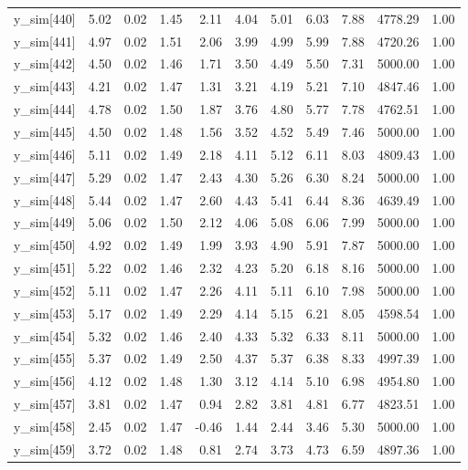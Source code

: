\begin{table}[ht]
\begin{tabular}{rrrrrrrrrrr}
  y\_sim[440] & 5.02 & 0.02 & 1.45 & 2.11 & 4.04 & 5.01 & 6.03 & 7.88 & 4778.29 & 1.00 \\ 
  y\_sim[441] & 4.97 & 0.02 & 1.51 & 2.06 & 3.99 & 4.99 & 5.99 & 7.88 & 4720.26 & 1.00 \\ 
  y\_sim[442] & 4.50 & 0.02 & 1.46 & 1.71 & 3.50 & 4.49 & 5.50 & 7.31 & 5000.00 & 1.00 \\ 
  y\_sim[443] & 4.21 & 0.02 & 1.47 & 1.31 & 3.21 & 4.19 & 5.21 & 7.10 & 4847.46 & 1.00 \\ 
  y\_sim[444] & 4.78 & 0.02 & 1.50 & 1.87 & 3.76 & 4.80 & 5.77 & 7.78 & 4762.51 & 1.00 \\ 
  y\_sim[445] & 4.50 & 0.02 & 1.48 & 1.56 & 3.52 & 4.52 & 5.49 & 7.46 & 5000.00 & 1.00 \\ 
  y\_sim[446] & 5.11 & 0.02 & 1.49 & 2.18 & 4.11 & 5.12 & 6.11 & 8.03 & 4809.43 & 1.00 \\ 
  y\_sim[447] & 5.29 & 0.02 & 1.47 & 2.43 & 4.30 & 5.26 & 6.30 & 8.24 & 5000.00 & 1.00 \\ 
  y\_sim[448] & 5.44 & 0.02 & 1.47 & 2.60 & 4.43 & 5.41 & 6.44 & 8.36 & 4639.49 & 1.00 \\ 
  y\_sim[449] & 5.06 & 0.02 & 1.50 & 2.12 & 4.06 & 5.08 & 6.06 & 7.99 & 5000.00 & 1.00 \\ 
  y\_sim[450] & 4.92 & 0.02 & 1.49 & 1.99 & 3.93 & 4.90 & 5.91 & 7.87 & 5000.00 & 1.00 \\ 
  y\_sim[451] & 5.22 & 0.02 & 1.46 & 2.32 & 4.23 & 5.20 & 6.18 & 8.16 & 5000.00 & 1.00 \\ 
  y\_sim[452] & 5.11 & 0.02 & 1.47 & 2.26 & 4.11 & 5.11 & 6.10 & 7.98 & 5000.00 & 1.00 \\ 
  y\_sim[453] & 5.17 & 0.02 & 1.49 & 2.29 & 4.14 & 5.15 & 6.21 & 8.05 & 4598.54 & 1.00 \\ 
  y\_sim[454] & 5.32 & 0.02 & 1.46 & 2.40 & 4.33 & 5.32 & 6.33 & 8.11 & 5000.00 & 1.00 \\ 
  y\_sim[455] & 5.37 & 0.02 & 1.49 & 2.50 & 4.37 & 5.37 & 6.38 & 8.33 & 4997.39 & 1.00 \\ 
  y\_sim[456] & 4.12 & 0.02 & 1.48 & 1.30 & 3.12 & 4.14 & 5.10 & 6.98 & 4954.80 & 1.00 \\ 
  y\_sim[457] & 3.81 & 0.02 & 1.47 & 0.94 & 2.82 & 3.81 & 4.81 & 6.77 & 4823.51 & 1.00 \\ 
  y\_sim[458] & 2.45 & 0.02 & 1.47 & -0.46 & 1.44 & 2.44 & 3.46 & 5.30 & 5000.00 & 1.00 \\ 
  y\_sim[459] & 3.72 & 0.02 & 1.48 & 0.81 & 2.74 & 3.73 & 4.73 & 6.59 & 4897.36 & 1.00 \\ 

\end{tabular}
\end{table}
